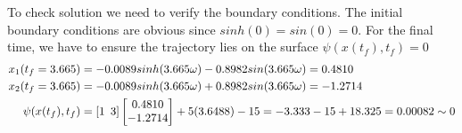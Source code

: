 \begin{enumerate}
\begin{enumerate}
To check solution we need to verify the boundary conditions. The initial boundary conditions are obvious since $sinh(0) = sin(0) = 0$. For the final time, we have to ensure the 
trajectory lies on the surface $\psi(x(t_f),t_f) = 0$
\begin{align*}
x_1(t_f = 3.665) &= -0.0089 sinh(3.665\omega) -0.8982 sin(3.665\omega) = 0.4810\\
x_2(t_f = 3.665) &= -0.0089 sinh(3.665\omega) +0.8982 sin(3.665\omega) =-1.2714 \\
\psi(x(t_f),t_f) &= [1\enskip 3] \begin{bmatrix}
                           0.4810 \\
                           -1.2714
                          \end{bmatrix} + 5(3.6488) - 15 = -3.333 -15 + 18.325 = 0.00082 \sim 0 
\end{align*}


\end{enumerate}
\end{enumerate}
